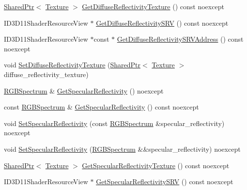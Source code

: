 \begin{DoxyCompactItemize}
\item 
\hyperlink{namespacemage_a1e01ae66713838a7a67d30e44c67703e}{Shared\+Ptr}$<$ \hyperlink{classmage_1_1_texture}{Texture} $>$ \hyperlink{structmage_1_1_shaded_material_a461a080a923578673ce04c83cc3d9dbd}{Get\+Diffuse\+Reflectivity\+Texture} () const noexcept
\item 
I\+D3\+D11\+Shader\+Resource\+View $\ast$ \hyperlink{structmage_1_1_shaded_material_a4e163bd276e41b01973a5d968f6f5716}{Get\+Diffuse\+Reflectivity\+S\+RV} () const noexcept
\item 
I\+D3\+D11\+Shader\+Resource\+View $\ast$const  $\ast$ \hyperlink{structmage_1_1_shaded_material_ac16eeb140fbe15f410021ad56c8d7f6d}{Get\+Diffuse\+Reflectivity\+S\+R\+V\+Address} () const noexcept
\item 
void \hyperlink{structmage_1_1_shaded_material_add7475d986df558d289952a6ae2dbd73}{Set\+Diffuse\+Reflectivity\+Texture} (\hyperlink{namespacemage_a1e01ae66713838a7a67d30e44c67703e}{Shared\+Ptr}$<$ \hyperlink{classmage_1_1_texture}{Texture} $>$ diffuse\+\_\+reflectivity\+\_\+texture)
\item 
\hyperlink{structmage_1_1_r_g_b_spectrum}{R\+G\+B\+Spectrum} \& \hyperlink{structmage_1_1_shaded_material_aa13cf6b1af3568471ebd0f93a0bc08ac}{Get\+Specular\+Reflectivity} () noexcept
\item 
const \hyperlink{structmage_1_1_r_g_b_spectrum}{R\+G\+B\+Spectrum} \& \hyperlink{structmage_1_1_shaded_material_a7655315b6654ee4f6f34ac2489ee6f92}{Get\+Specular\+Reflectivity} () const noexcept
\item 
void \hyperlink{structmage_1_1_shaded_material_aa31a28ef31f98adf3ccf1fa83e6db9fb}{Set\+Specular\+Reflectivity} (const \hyperlink{structmage_1_1_r_g_b_spectrum}{R\+G\+B\+Spectrum} \&specular\+\_\+reflectivity) noexcept
\item 
void \hyperlink{structmage_1_1_shaded_material_acfe55ee6398b1255d48d7e72a543f127}{Set\+Specular\+Reflectivity} (\hyperlink{structmage_1_1_r_g_b_spectrum}{R\+G\+B\+Spectrum} \&\&specular\+\_\+reflectivity) noexcept
\item 
\hyperlink{namespacemage_a1e01ae66713838a7a67d30e44c67703e}{Shared\+Ptr}$<$ \hyperlink{classmage_1_1_texture}{Texture} $>$ \hyperlink{structmage_1_1_shaded_material_aabf7fea125dfdf4d97537f22e0003a9e}{Get\+Specular\+Reflectivity\+Texture} () const noexcept
\item 
I\+D3\+D11\+Shader\+Resource\+View $\ast$ \hyperlink{structmage_1_1_shaded_material_a5ea5b4ad3100a2a625b2849ba142cdd6}{Get\+Specular\+Reflectivity\+S\+RV} () const noexcept

\end{DoxyCompactItemize}
